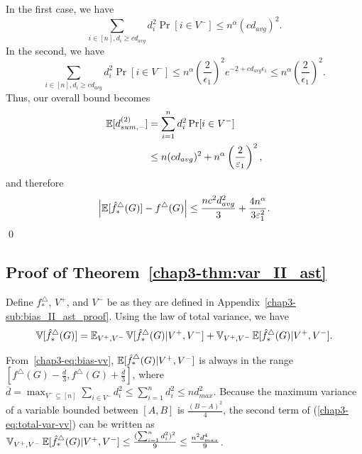 In the first case, we have
\[
  \sum_{i \in [n], d_i \geq c d_{avg}} d_i^2 \Pr[i \in V^-] \leq n^\alpha
  (cd_{avg})^2.
\]
In the second, we have
\[
  \sum_{i \in [n], d_i \geq c d_{avg}} d_i^2 \Pr[i \in V^-] \leq
  n^\alpha\left(\frac{2}{\epsilon_1}\right)^2 e^{-2 + cd_{avg} \epsilon_1} \leq
  n^\alpha\left(\frac{2}{\epsilon_1}\right)^2.
\]
Thus, our overall bound becomes 
\begin{align*}
  \operatorname{\mathbb{E}}[d_{sum,-}^{(2)}] &= \sum_{i = 1}^n d_i^2 \Pr[i \in V^-] \\
  &\leq n(c d_{avg})^2 + n^\alpha \left(\frac{2}{\varepsilon_1}\right)^2,
\end{align*}
and therefore 
\[
  \left|\operatorname{\mathbb{E}}[\hat{f}^\triangle_*(G)] -
  f^\triangle(G)\right| \leq
  \frac{n c^2 d_{avg}^2}{3}  + \frac{4 n^\alpha}{3 \varepsilon_1^2}.
\]\qed

\subsection{Proof of Theorem~\ref{chap3-thm:var_II_ast}}
\label{chap3-sub:var_II_ast_proof}

Define $f^\triangle_*$, $V^+$, and $V^-$ be as they are defined in
Appendix~\ref{chap3-sub:bias_II_ast_proof}. 
Using the law of total variance, we have
\begin{equation}\label{chap3-eq:total-var-vv}
  \operatorname{\mathbb{V}}[\hat{f}_*^\triangle(G)] = \operatorname{\mathbb{E}}_{V^+,V^-}\operatorname{\mathbb{V}}[\hat{f}_*^\triangle(G)|V^+,V^-] +
  \operatorname{\mathbb{V}}_{V^+,V^-}\operatorname{\mathbb{E}}[\hat{f}_*^\triangle(G)|V^+,V^-].
\end{equation}

From~\eqref{chap3-eq:bias-vv}, $\operatorname{\mathbb{E}}[\hat{f}_*^\triangle(G)|V^+,V^-]$ is always in the
range $[f^\triangle(G) - \frac{\overline{d}}{3}, f^\triangle(G) + \frac{
  \overline{d}}{3}]$, where $\overline{d} = 
\max_{V^- \subseteq [n]} \sum_{i \in V^-} d_i^2 \leq \sum_{i=1}^n d_i^2 \leq n d_{max}^2$.
Because the maximum variance of a variable bounded between $[A,B]$ is
$\frac{(B-A)^2}{4}$, 
the second term of (\ref{chap3-eq:total-var-vv}) can be written as 
$\operatorname{\mathbb{V}}_{V^+,V^-}\operatorname{\mathbb{E}}[\hat{f}_*^\triangle(G)|V^+,V^-] 
\leq \allowbreak \frac{(\sum_{i=1}^n d_i^2)^2}{9} \leq \frac{n^2 d_{max}^4}{9} $.

